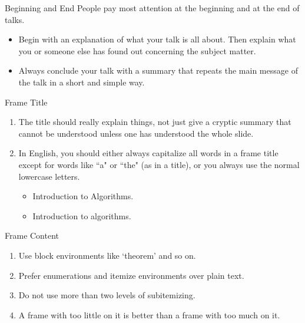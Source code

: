 \documentclass[compress,aspectratio=43]{beamer}
\begin{document}
\begin{frame}{Beginning and End}
    People pay most attention at the beginning and at the end of talks.

    \medskip
    \begin{itemize}
        \item Begin with an explanation of what your talk is all about. Then explain what you or someone else has found out concerning the subject matter.

              \medskip
        \item Always conclude your talk with a summary that repeats the main message of the talk in a short and simple way.
    \end{itemize}

\end{frame}

\begin{frame}{Frame Title}
    \begin{enumerate}
        \item The title should really explain things, not just give a cryptic summary that cannot be understood unless one has understood the whole slide.

              \medskip
        \item In English, you should either always capitalize all words in a frame title except for words like ``a" or ``the" (as in a title), or you always use the normal lowercase letters.
              \begin{itemize}
                  \item Introduction to Algorithms.
                  \item Introduction to algorithms.
              \end{itemize}
    \end{enumerate}
\end{frame}

\begin{frame}{Frame Content}
    \begin{enumerate}
        \item Use block environments like `theorem' and so on.

              \medskip
        \item Prefer enumerations and itemize environments over plain text.

              \medskip
        \item Do not use more than two levels of subitemizing.

              \medskip
        \item A frame with too little on it is better than a frame with too much on it.
    \end{enumerate}
\end{frame}
\end{document}
